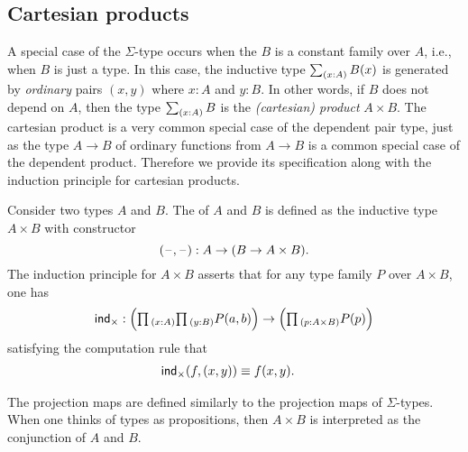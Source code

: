\subsection{Cartesian products}

A special case of the $\Sigma$-type occurs when the $B$ is a constant family over $A$, i.e., when $B$ is just a type.
In this case, the inductive type $\sm{x:A}B(x)$ is generated by \emph{ordinary} pairs $(x,y)$ where $x:A$ and $y:B$. In other words, if $B$ does not depend on $A$, then the type $\sm{x:A}B$ is the \emph{(cartesian) product} $A\times B$.
The cartesian product is a very common special case of the dependent pair type, just as the type $A\to B$ of ordinary functions from $A\to B$ is a common special case of the dependent product. Therefore we provide its specification along with the induction principle for cartesian products.

\begin{defn}
Consider two types $A$ and $B$. The  of $A$ and $B$ is defined as the inductive type $A\times B$ with constructor
\begin{equation*}
(\mathord{\hspace{1pt}\text{--}\hspace{1pt}},\mathord{\hspace{1pt}\text{--}\hspace{1pt}}):A\to (B\to A\times B).
\end{equation*}
The induction principle for $A\times B$ asserts that for any type family $P$ over $A\times B$, one has
\begin{equation*}
\ind{\times} : \Big(\prd{x:A}\prd{y:B}P(a,b)\Big)\to\Big(\prd{p:A\times B} P(p)\Big)
\end{equation*}
satisfying the computation rule that
\begin{align*}
\mathsf{ind}_{\times}(f,(x,y)) & \equiv f(x,y).
\end{align*}
\end{defn}

The projection maps are defined similarly to the projection maps of $\Sigma$-types. When one thinks of types as propositions, then $A\times B$ is interpreted as the conjunction of $A$ and $B$.


